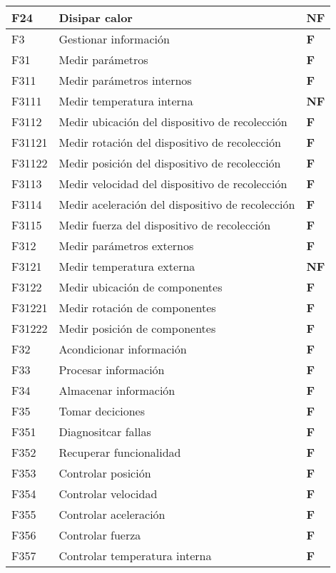 \begin{center}
\begin{supertabular}{p{3em}p{15em}p{3em}}
    F24   & Disipar calor & \textbf{NF} \\
    \hline
    F3    & Gestionar informaci\'on & \textbf{F} \\
    F31   & Medir par\'ametros & \textbf{F} \\
    F311  & Medir par\'ametros internos & \textbf{F} \\
    F3111 & Medir temperatura interna & \textbf{NF} \\
    F3112 & Medir ubicaci\'on del dispositivo de recolecci\'on & \textbf{F} \\
    F31121 & Medir rotaci\'on del dispositivo de recolecci\'on & \textbf{F} \\
    F31122 & Medir posici\'on del dispositivo de recolecci\'on & \textbf{F} \\
    F3113 & Medir velocidad del dispositivo de recolecci\'on & \textbf{F} \\
    F3114 & Medir aceleraci\'on del dispositivo de recolecci\'on & \textbf{F} \\
    F3115 & Medir fuerza del dispositivo de recolecci\'on & \textbf{F} \\
    F312  & Medir par\'ametros externos & \textbf{F} \\
    F3121 & Medir temperatura externa & \textbf{NF} \\
    F3122 & Medir ubicaci\'on de componentes & \textbf{F} \\
    F31221 & Medir rotaci\'on de componentes & \textbf{F} \\
    F31222 & Medir posici\'on de componentes & \textbf{F} \\
    F32   & Acondicionar informaci\'on & \textbf{F} \\
    F33   & Procesar informaci\'on & \textbf{F} \\
    F34   & Almacenar informaci\'on & \textbf{F} \\
    F35   & Tomar deciciones & \textbf{F} \\
    F351  & Diagnositcar fallas & \textbf{F} \\
    F352  & Recuperar funcionalidad & \textbf{F} \\
    F353  & Controlar posici\'on & \textbf{F} \\
    F354  & Controlar velocidad & \textbf{F} \\
    F355  & Controlar aceleraci\'on & \textbf{F} \\
    F356  & Controlar fuerza & \textbf{F} \\
    F357  & Controlar temperatura interna & \textbf{F} \\

\end{supertabular}
\end{center}
